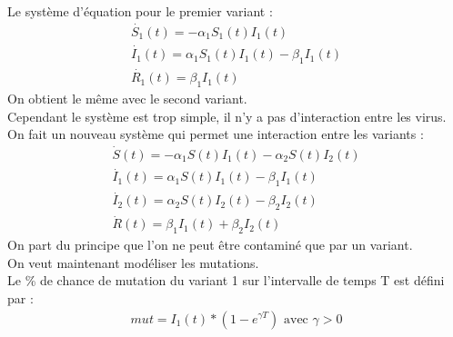\documentclass{article}
\begin{document}
Le système d'équation pour le premier variant : 
\begin{align}
    \dot{S_1}(t)= -\alpha_1 S_1(t)I_1(t) \\
    \dot{I_1}(t)= \alpha_1 S_1(t)I_1(t)-\beta_1 I_1(t) \\
    \dot{R_1}(t)= \beta_1 I_1(t)
\end{align}
On obtient le même avec le second variant. \\
Cependant le système est trop simple, il n'y a pas d'interaction entre les virus. \\
On fait un nouveau système qui permet une interaction entre les variants :
\begin{align}
    \dot{S}(t)= -\alpha_1 S(t)I_1(t) - \alpha_2 S(t)I_2(t) \\
    \dot{I_1}(t)= \alpha_1 S(t)I_1(t)-\beta_1 I_1(t) \\
    \dot{I_2}(t)= \alpha_2 S(t)I_2(t)-\beta_2 I_2(t) \\
    \dot{R}(t)= \beta_1 I_1(t) + \beta_2 I_2(t)
\end{align}
On part du principe que l'on ne peut être contaminé que par un variant. \\
On veut maintenant modéliser les mutations.\\
Le \% de chance de mutation du variant 1 sur l'intervalle de temps T est défini par :
\begin{align}
    mut = I_1(t)*(1-e^{\gamma T})\text{ avec }\gamma > \text{0}
\end{align}
\end{document}
